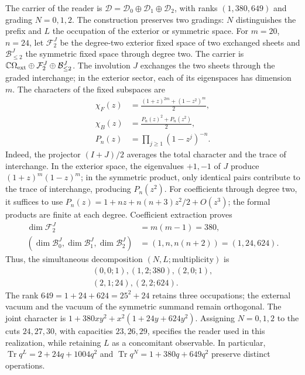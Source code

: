 The carrier of the reader is $\mathcal D=\mathcal D_0\oplus\mathcal D_1
\oplus\mathcal D_2$, with ranks $(1,380,649)$ and grading $N=0,1,2$.
The construction preserves two gradings: $N$ distinguishes the prefix and $L$
the occupation of the exterior or symmetric space. For $m=20$, $n=24$,
let $\mathcal F_2^J$ be the degree-two exterior fixed space of two exchanged
sheets and $\mathcal B_{\le2}^J$ the symmetric fixed space through degree two.
The carrier is
$\mathbb C\Omega_{\rm ext}\oplus\mathcal F_2^J\oplus\mathcal B_{\le2}^J$.
The involution $J$ exchanges the two sheets through the graded interchange;
in the exterior sector, each of its eigenspaces has dimension $m$.
The characters of the fixed subspaces are
\begin{equation}
 \begin{aligned}
 \chi_F(z)&=\frac{(1+z)^{2m}+(1-z^2)^m}{2},\\
 \chi_B(z)&=\frac{P_n(z)^2+P_n(z^2)}{2},\\
 P_n(z)&=\prod_{j\ge1}(1-z^j)^{-n}.
 \end{aligned}
 \label{md:r27:caracteres-fock}
\end{equation}
Indeed, the projector $(I+J)/2$ averages the total character and the trace
of interchange. In the exterior space, the eigenvalues $+1,-1$ of $J$
produce $(1+z)^m(1-z)^m$; in the symmetric product, only identical pairs
contribute to the trace of interchange, producing $P_n(z^2)$.
For coefficients through degree two, it suffices to use
$P_n(z)=1+nz+n(n+3)z^2/2+O(z^3)$; the formal products are finite at
each degree. Coefficient extraction proves
\begin{equation}
 \begin{split}
 \dim\mathcal F_2^J&=m(m-1)=380,\\
 (\dim\mathcal B_0^J,\dim\mathcal B_1^J,\dim\mathcal B_2^J)
 &=(1,n,n(n+2))=(1,24,624).
 \end{split}
 \label{md:r27:grados-fock}
\end{equation}
Thus, the simultaneous decomposition $(N,L;\text{multiplicity})$ is
\[
 \begin{gathered}
 (0,0;1),(1,2;380),(2,0;1),\\
 (2,1;24),(2,2;624).
 \end{gathered}
\]
The rank $649=1+24+624=25^2+24$ retains three occupations; the external vacuum
and the vacuum of the symmetric summand remain orthogonal. The joint character
is $1+380xy^2+x^2(1+24y+624y^2)$.
Assigning $N=0,1,2$ to the cuts $24,27,30$, with capacities
$23,26,29$, specifies the reader used in this realization, while retaining $L$
as a concomitant observable. In particular,
$\operatorname{Tr}q^L=2+24q+1004q^2$ and
$\operatorname{Tr}q^N=1+380q+649q^2$ preserve distinct operations.


